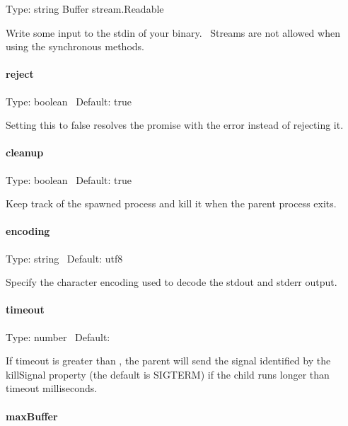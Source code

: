 Type\+: {\ttfamily string} {\ttfamily Buffer} {\ttfamily stream.\+Readable}

Write some input to the {\ttfamily stdin} of your binary.~\newline
 Streams are not allowed when using the synchronous methods.

\paragraph*{reject}

Type\+: {\ttfamily boolean}~\newline
 Default\+: {\ttfamily true}

Setting this to {\ttfamily false} resolves the promise with the error instead of rejecting it.

\paragraph*{cleanup}

Type\+: {\ttfamily boolean}~\newline
 Default\+: {\ttfamily true}

Keep track of the spawned process and {\ttfamily kill} it when the parent process exits.

\paragraph*{encoding}

Type\+: {\ttfamily string}~\newline
 Default\+: {\ttfamily utf8}

Specify the character encoding used to decode the {\ttfamily stdout} and {\ttfamily stderr} output.

\paragraph*{timeout}

Type\+: {\ttfamily number}~\newline
 Default\+: {}

If timeout is greater than {}, the parent will send the signal identified by the {\ttfamily kill\+Signal} property (the default is {\ttfamily S\+I\+G\+T\+E\+RM}) if the child runs longer than timeout milliseconds.

\paragraph*{max\+Buffer}

